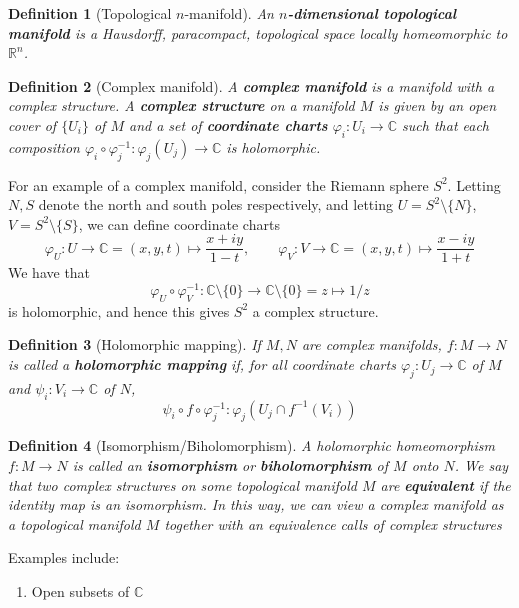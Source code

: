 \documentclass{article}
\newcommand{\mbb}[1]{\mathbb{#1}}
\newcommand{\reals}{\mbb{R}}
\newtheorem{definition}{Definition}
\begin{document}
\begin{definition}[Topological \(n\)-manifold]
An \textbf{\(n\)-dimensional topological manifold} is a Hausdorff, paracompact, topological space locally homeomorphic to \(\reals^n\).
\end{definition}

\begin{definition}[Complex manifold]
A \textbf{complex manifold} is a manifold with a complex structure. A \textbf{complex structure} on a manifold \(M\) is given by an open cover of \(\{U_i\}\) of \(M\) and a set of \textbf{coordinate charts} \(\varphi_i: U_i \to \mbb{C}\) such that each composition \(\varphi_i \circ \varphi_j^{-1}: \varphi_j(U_j) \to \mbb{C}\) is holomorphic.
\end{definition}

For an example of a complex manifold, consider the Riemann sphere \(S^2\). Letting \(N, S\) denote the north and south poles respectively, and letting \(U = S^2 \setminus \{N\}\), \(V = S^2 \setminus \{S\}\), we can define coordinate charts
\[\varphi_U: U \to \mbb{C} = (x, y, t) \mapsto \frac{x + iy}{1 - t}, \qquad \varphi_V: V \to \mbb{C} = (x, y, t) \mapsto \frac{x - iy}{1 + t}\]
We have that
\[\varphi_U \circ \varphi_V^{-1}: \mbb{C} \setminus \{0\} \to \mbb{C} \setminus \{0\} = z \mapsto 1/z\]
is holomorphic, and hence this gives \(S^2\) a complex structure.

\begin{definition}[Holomorphic mapping]
If \(M, N\) are complex manifolds, \(f: M \to N\) is called a \textbf{holomorphic mapping} if, for all coordinate charts \(\varphi_j: U_j \to \mbb{C}\) of \(M\) and \(\psi_i: V_i \to \mbb{C}\) of \(N\),
\[\psi_i \circ f \circ \varphi_j^{-1}: \varphi_j(U_j \cap f^{-1}(V_i))\]
\end{definition}

\begin{definition}[Isomorphism/Biholomorphism]
A holomorphic homeomorphism \(f: M \to N\) is called an \textbf{isomorphism} or \textbf{biholomorphism} of \(M\) onto \(N\). We say that two complex structures on some topological manifold \(M\) are \textbf{equivalent} if the identity map is an isomorphism. In this way, we can view a complex manifold as a topological manifold \(M\) together with an equivalence calls of complex structures
\end{definition}

Examples include:
\begin{enumerate}

  \item Open subsets of \(\mbb{C}\)

\end{enumerate}
\end{document}
